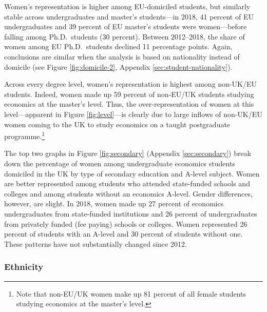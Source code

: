 \documentclass[a4paper, 1]{article}
\begin{document}
Women's representation is higher among EU-domiciled students, but similarly stable across undergraduates and master's students---in 2018, 41 percent of EU undergraduates and 39 percent of EU master's students were women---before falling among Ph.D.~students (30 percent). Between 2012--2018, the share of women among EU Ph.D.~students declined 11 percentage points. Again, conclusions are similar when the analysis is based on nationality instead of domicile (see Figure \ref{fig:domicile-2}, Appendix \ref{sec:student-nationality}).

Across every degree level, women's representation is highest among non-UK/EU students. Indeed, women made up 59 percent of non-EU/UK students studying economics at the master's level. Thus, the over-representation of women at this level---apparent in Figure \ref{fig:level}---is clearly due to large inflows of non-UK/EU women coming to the UK to study economics on a taught postgraduate programme.\footnote{Note that non-EU/UK women make up 81 percent of all female students studying economics at the master's level.}

The top two graphs in Figure \ref{fig:secondary} (Appendix \ref{sec:secondary}) break down the percentage of women among undergraduate economics students domiciled in the UK by type of secondary education and A-level subject. Women are better represented among students who attended state-funded schools and colleges and among students without an economics A-level. Gender differences, however, are slight. In 2018, women made up 27 percent of economics undergraduates from state-funded institutions and 26 percent of undergraduates from privately funded (fee paying) schools or colleges. Women represented 26 percent of students with an A-level and 30 percent of students without one. These patterns have not substantially changed since 2012.

\hypertarget{ethnicity-1}{%
\subsubsection{Ethnicity}\label{ethnicity-1}}
\end{document}
